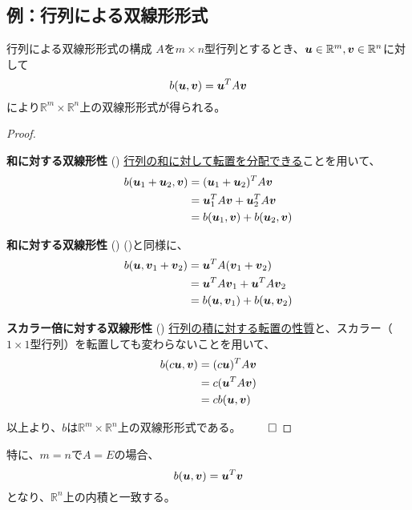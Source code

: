 \documentclass[../../../topic_linear-algebra]{subfiles}
\begin{document}
\subsection{例：行列による双線形形式}

\begin{theorem*}{行列による双線形形式の構成}
  $A$を$m \times n$型行列とするとき、$\vb*{u} \in \mathbb{R}^m, \vb*{v} \in \mathbb{R}^n$に対して
  \begin{equation*}
    b(\vb*{u}, \vb*{v}) = \vb*{u}^T A \vb*{v}
  \end{equation*}
  により$\mathbb{R}^m \times \mathbb{R}^n$上の双線形形式が得られる。
\end{theorem*}

\begin{proof}
  \begin{subpattern}{{\bfseries 和に対する双線形性} ()}
    \hyperref[thm:transpose-distributes-over-sum]{行列の和に対して転置を分配できる}ことを用いて、
    \begin{align*}
      b(\vb*{u}_1 + \vb*{u}_2, \vb*{v}) &= (\vb*{u}_1 + \vb*{u}_2)^T A \vb*{v} \\
      &= \vb*{u}_1^T A \vb*{v} + \vb*{u}_2^T A \vb*{v} \\
      &= b(\vb*{u}_1, \vb*{v}) + b(\vb*{u}_2, \vb*{v})
    \end{align*}
  \end{subpattern}
  
  \begin{subpattern}{{\bfseries 和に対する双線形性} ()}
    ()と同様に、
    \begin{align*}
      b(\vb*{u}, \vb*{v}_1 + \vb*{v}_2) &= \vb*{u}^T A (\vb*{v}_1 + \vb*{v}_2) \\
      &= \vb*{u}^T A \vb*{v}_1 + \vb*{u}^T A \vb*{v}_2 \\
      &= b(\vb*{u}, \vb*{v}_1) + b(\vb*{u}, \vb*{v}_2)
    \end{align*}
  \end{subpattern}
  
  \begin{subpattern}{{\bfseries スカラー倍に対する双線形性} ()}
    \hyperref[thm:transpose-of-product]{行列の積に対する転置の性質}と、スカラー（$1 \times 1$型行列）を転置しても変わらないことを用いて、
    \begin{align*}
      b(c\vb*{u}, \vb*{v}) &= (c\vb*{u})^T A \vb*{v} \\
      &= c(\vb*{u}^T A \vb*{v}) \\
      &= cb(\vb*{u}, \vb*{v})
    \end{align*}
  \end{subpattern}
  
  以上より、$b$は$\mathbb{R}^m \times \mathbb{R}^n$上の双線形形式である。 $\qed$
\end{proof}

\br

特に、$m =n$で$A = E$の場合、
\begin{equation*}
  b(\vb*{u}, \vb*{v}) = \vb*{u}^T \vb*{v}
\end{equation*}
となり、$\mathbb{R}^n$上の内積と一致する。
\end{document}
